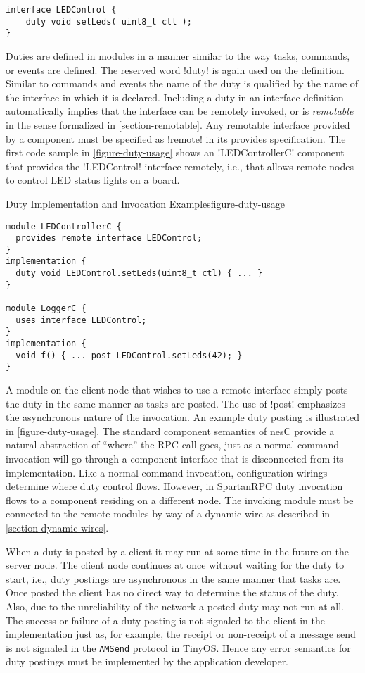 \singlespace
\begin{lstlisting}
interface LEDControl {
    duty void setLeds( uint8_t ctl );
}
\end{lstlisting}
\primaryspacing

Duties are defined in modules in a manner similar to the way tasks, commands, or events are
defined. The reserved word !duty! is again used on the definition. Similar to commands and
events the name of the duty is qualified by the name of the interface in which it is declared.
Including a duty in an interface definition automatically implies that the interface can be
remotely invoked, or is \emph{remotable} in the sense formalized in \autoref{section-remotable}.
Any remotable interface provided by a component must be specified as !remote! in its provides
specification. The first code sample in \autoref{figure-duty-usage} shows an !LEDControllerC!
component that provides the !LEDControl! interface remotely, i.e., that allows remote nodes to
control LED status lights on a board.

\begin{fpfig}[t]{Duty Implementation and Invocation Examples}{figure-duty-usage}
{
\singlespace
\begin{lstlisting}
module LEDControllerC {
  provides remote interface LEDControl;
}
implementation {
  duty void LEDControl.setLeds(uint8_t ctl) { ... }
} 
 
module LoggerC {
  uses interface LEDControl;
}
implementation {
  void f() { ... post LEDControl.setLeds(42); }
}
\end{lstlisting}
\primaryspacing
}
\end{fpfig}

A module on the client node that wishes to use a remote interface simply posts the duty in the
same manner as tasks are posted. The use of !post! emphasizes the asynchronous nature of the
invocation. An example duty posting is illustrated in \autoref{figure-duty-usage}. The standard
component semantics of nesC provide a natural abstraction of ``where'' the RPC call goes, just
as a normal command invocation will go through a component interface that is disconnected from
its implementation. Like a normal command invocation, configuration wirings determine where duty
control flows. However, in SpartanRPC duty invocation flows to a component residing on a
different node. The invoking module must be connected to the remote modules by way of a dynamic
wire as described in \autoref{section-dynamic-wires}.

When a duty is posted by a client it may run at some time in the future on the server node. The
client node continues at once without waiting for the duty to start, i.e., duty postings are
asynchronous in the same manner that tasks are. Once posted the client has no direct way to
determine the status of the duty. Also, due to the unreliability of the network a posted duty
may not run at all. The success or failure of a duty posting is not signaled to the client in
the implementation just as, for example, the receipt or non-receipt of a message send is not
signaled in the \texttt{AMSend} protocol in TinyOS. Hence any error semantics for duty postings
must be implemented by the application developer.

